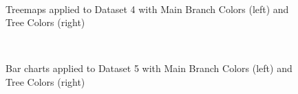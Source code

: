 \documentclass[review,journal]{vgtc}         %
\begin{document}
\begin{figure}[tb]
  \centering
  \mbox{
  }
  \caption{Treemaps applied to Dataset 4 with Main Branch Colors (left) and Tree Colors (right)}\label{fig:treemapSvy}

\end{figure}



\begin{figure}[tb]
  \centering
  \mbox{
  }
  \caption{Bar charts applied to Dataset 5 with Main Branch Colors (left) and Tree Colors (right)}\label{fig:barSvy}

\end{figure}
\end{document}
